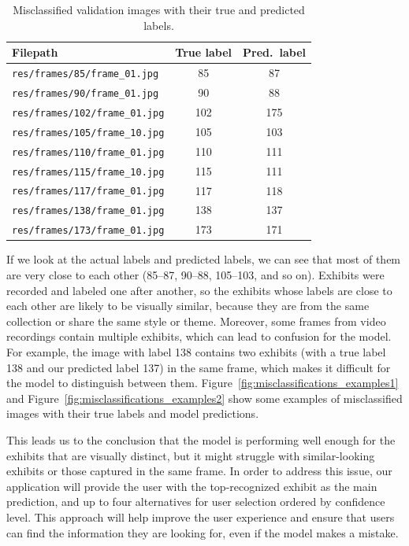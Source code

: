 \begin{table}[h]
    \centering
    \begin{tabular}{lcc}
        \toprule
        \textbf{Filepath} & \textbf{True label} & \textbf{Pred.\ label} \\
        \midrule
        \texttt{res/frames/85/frame\_01.jpg}  & 85  & 87  \\
        \texttt{res/frames/90/frame\_01.jpg}  & 90  & 88  \\
        \texttt{res/frames/102/frame\_01.jpg} & 102 & 175 \\
        \texttt{res/frames/105/frame\_10.jpg} & 105 & 103 \\
        \texttt{res/frames/110/frame\_01.jpg} & 110 & 111 \\
        \texttt{res/frames/115/frame\_10.jpg} & 115 & 111 \\
        \texttt{res/frames/117/frame\_01.jpg} & 117 & 118 \\
        \texttt{res/frames/138/frame\_01.jpg} & 138 & 137 \\
        \texttt{res/frames/173/frame\_01.jpg} & 173 & 171 \\
        \bottomrule
    \end{tabular}
    
    \caption{Misclassified validation images with their true and predicted labels.}\label{tab:misclassifications}
\end{table}

If we look at the actual labels and predicted labels, we can see that most of them are very close to each other (85--87, 90--88, 105--103, and so on). Exhibits were recorded and labeled one after another, so the exhibits whose labels are close to each other are likely to be visually similar, because they are from the same collection or share the same style or theme. Moreover, some frames from video recordings contain multiple exhibits, which can lead to confusion for the model. For example, the image with label 138 contains two exhibits (with a true label 138 and our predicted label 137) in the same frame, which makes it difficult for the model to distinguish between them. Figure~\ref{fig:misclassifications_examples1} and Figure~\ref{fig:misclassifications_examples2} show some examples of misclassified images with their true labels and model predictions.

This leads us to the conclusion that the model is performing well enough for the exhibits that are visually distinct, but it might struggle with similar-looking exhibits or those captured in the same frame. In order to address this issue, our application will provide the user with the top-recognized exhibit as the main prediction, and up to four alternatives for user selection ordered by confidence level. This approach will help improve the user experience and ensure that users can find the information they are looking for, even if the model makes a mistake.

